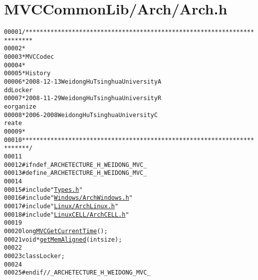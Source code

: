 \hypertarget{_arch_8h_source}{
\section{MVCCommonLib/Arch/Arch.h}
}


\begin{footnotesize}\begin{alltt}
00001 \textcolor{comment}{/************************************************************************}
00002 \textcolor{comment}{ *}
00003 \textcolor{comment}{ * MVC Codec}
00004 \textcolor{comment}{ * }
00005 \textcolor{comment}{ * History}
00006 \textcolor{comment}{ * 2008-12-13           Weidong Hu              Tsinghua University             A
      dd Locker}
00007 \textcolor{comment}{ * 2008-11-29           Weidong Hu              Tsinghua University             R
      eorganize}
00008 \textcolor{comment}{ * 2006-2008            Weidong Hu              Tsinghua University             C
      reate}
00009 \textcolor{comment}{ * }
00010 \textcolor{comment}{ ************************************************************************/}
00011 
00012 \textcolor{preprocessor}{#ifndef \_ARCHETECTURE\_H\_WEIDONG\_MVC\_}
00013 \textcolor{preprocessor}{}\textcolor{preprocessor}{#define \_ARCHETECTURE\_H\_WEIDONG\_MVC\_}
00014 \textcolor{preprocessor}{}
00015 \textcolor{preprocessor}{#include "\hyperlink{_types_8h}{Types.h}"}
00016 \textcolor{preprocessor}{#include "\hyperlink{_arch_windows_8h}{Windows/ArchWindows.h}"}
00017 \textcolor{preprocessor}{#include "\hyperlink{_arch_linux_8h}{Linux/ArchLinux.h}"}
00018 \textcolor{preprocessor}{#include "\hyperlink{_arch_c_e_l_l_8h}{LinuxCELL/ArchCELL.h}"}
00019 
00020 \textcolor{keywordtype}{long} \hyperlink{_arch_8h_aae16a08f453f828deb4ccd262d87a278}{MVCGetCurrentTime}();
00021 \textcolor{keywordtype}{void} *\hyperlink{_arch_8h_a82f8f71a4da739209ebbe575faa842e9}{getMemAligned}(\textcolor{keywordtype}{int} size);
00022 
00023 \textcolor{keyword}{class }Locker;
00024 
00025 \textcolor{preprocessor}{#endif //\_ARCHETECTURE\_H\_WEIDONG\_MVC\_}
\end{alltt}\end{footnotesize}

